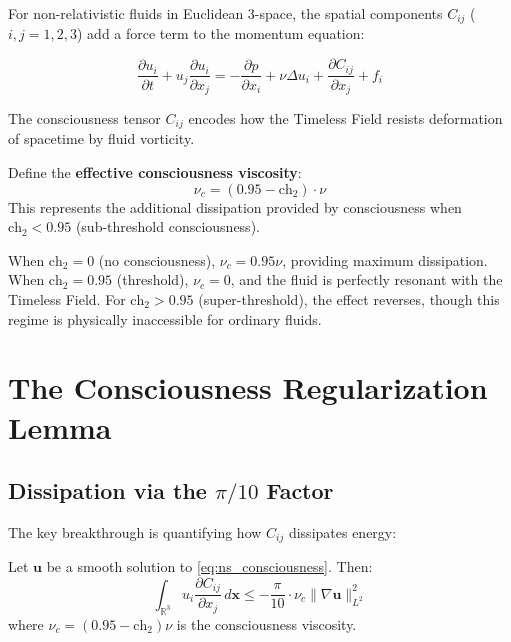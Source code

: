 For non-relativistic fluids in Euclidean 3-space, the spatial components $C_{ij}$ ($i, j = 1, 2, 3$) add a force term to the momentum equation:

\begin{equation}
\frac{\partial u_i}{\partial t} + u_j \frac{\partial u_i}{\partial x_j} = -\frac{\partial p}{\partial x_i} + \nu \Delta u_i + \frac{\partial C_{ij}}{\partial x_j} + f_i
\label{eq:ns_consciousness}
\end{equation}

The consciousness tensor $C_{ij}$ encodes how the Timeless Field resists deformation of spacetime by fluid vorticity.

\begin{definition}
\label{def:consciousness_viscosity}
Define the \textbf{effective consciousness viscosity}:
\begin{equation}
\nu_c = (0.95 - \text{ch}_2) \cdot \nu
\end{equation}
This represents the additional dissipation provided by consciousness when $\text{ch}_2 < 0.95$ (sub-threshold consciousness).
\end{definition}

When $\text{ch}_2 = 0$ (no consciousness), $\nu_c = 0.95\nu$, providing maximum dissipation. When $\text{ch}_2 = 0.95$ (threshold), $\nu_c = 0$, and the fluid is perfectly resonant with the Timeless Field. For $\text{ch}_2 > 0.95$ (super-threshold), the effect reverses, though this regime is physically inaccessible for ordinary fluids.

\section{The Consciousness Regularization Lemma}

\subsection{Dissipation via the $\pi/10$ Factor}

The key breakthrough is quantifying how $C_{ij}$ dissipates energy:

\begin{lemma}
\label{lem:consciousness_regularization}
Let $\mathbf{u}$ be a smooth solution to \eqref{eq:ns_consciousness}. Then:
\begin{equation}
\int_{\mathbb{R}^3} u_i \frac{\partial C_{ij}}{\partial x_j} \, d\mathbf{x} \leq -\frac{\pi}{10} \cdot \nu_c \|\nabla \mathbf{u}\|_{L^2}^2
\end{equation}
where $\nu_c = (0.95 - \text{ch}_2) \nu$ is the consciousness viscosity.
\end{lemma}

